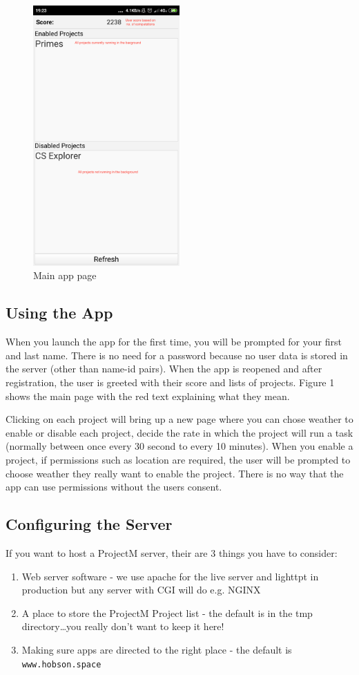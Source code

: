 \documentclass{article}
\begin{document}
\begin{figure}
  \centering
  \includegraphics[width=0.5\textwidth]{DocFiles/main_page}
  \caption{Main app page}
\end{figure}
\subsection{Using the App}
When you launch the app for the first time, you will be prompted for your first and last name. There is no need for a password because
no user data is stored in the server (other than name-id pairs).
When the app is reopened and after registration, the user is greeted with their score and lists of projects. Figure 1 shows 
the main page with the red text explaining what they mean.

Clicking on each project will bring up a new page where you can chose weather to enable or disable each project, decide the 
rate in which the project will run a task (normally between once every 30 second to every 10 minutes). When you enable
a project, if permissions such as location are required, the user will be prompted to choose weather they really want to
enable the project. There is no way that the app can use permissions without the users consent.

\subsection{Configuring the Server}
If you want to host a ProjectM server, their are 3 things you have to consider:
\begin{enumerate}
  \item{Web server software - we use apache for the live server and lighttpt in production but any server with CGI will do e.g. NGINX}
  \item{A place to store the ProjectM Project list - the default is in the tmp directory\dots you really don't want to keep it here!}
  \item{Making sure apps are directed to the right place - the default is \texttt{www.hobson.space}}
\end{enumerate}
\end{document}
